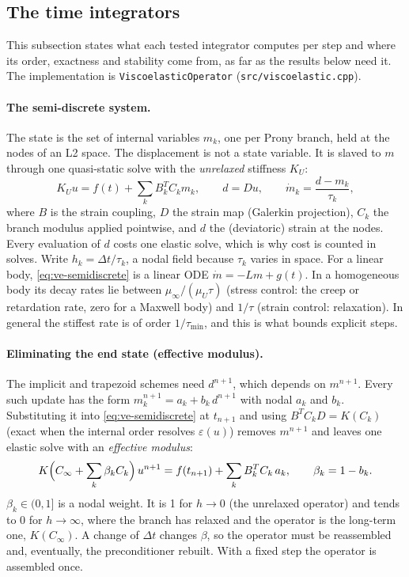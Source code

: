 \documentclass[11pt]{article}
\numberwithin{equation}{section}
\newcommand{\eps}{\varepsilon}
\newcommand{\code}[1]{\texttt{#1}}
\begin{document}
\subsection{The time integrators}
\label{sec:steppers}

This subsection states what each tested integrator computes per step and
where its order, exactness and stability come from, as far as the results
below need it. The implementation is \code{ViscoelasticOperator}
(\code{src/viscoelastic.cpp}).

\paragraph{The semi-discrete system.}
The state is the set of internal variables $m_k$, one per Prony branch,
held at the nodes of an L2 space. The displacement is not a state
variable. It is slaved to $m$ through one quasi-static solve with the
\emph{unrelaxed} stiffness $K_U$:
\begin{equation}
  K_U u = f(t) + \sum_k B_k^{T} C_k m_k,\qquad d = D u,\qquad
  \dot m_k = \frac{d - m_k}{\tau_k},
  \label{eq:ve-semidiscrete}
\end{equation}
where $B$ is the strain coupling, $D$ the strain map (Galerkin projection),
$C_k$ the branch modulus applied pointwise, and $d$ the (deviatoric)
strain at the nodes. Every evaluation of $d$ costs one elastic solve, which
is why cost is counted in solves. Write $h_k=\Delta t/\tau_k$, a nodal field
because $\tau_k$ varies in space. For a linear body,
\eqref{eq:ve-semidiscrete} is a linear ODE $\dot m=-Lm+g(t)$. In a
homogeneous body its decay rates lie between $\mu_\infty/(\mu_U\tau)$
(stress control: the creep or retardation rate, zero for a Maxwell body)
and $1/\tau$ (strain control: relaxation). In general the stiffest rate is
of order $1/\tau_{\min}$, and this is what bounds explicit steps.

\paragraph{Eliminating the end state (effective modulus).}
The implicit and trapezoid schemes need $d^{n+1}$, which depends on
$m^{n+1}$. Every such update has the form
$m_k^{n+1}=a_k + b_k\,d^{n+1}$ with nodal $a_k$ and $b_k$. Substituting it
into \eqref{eq:ve-semidiscrete} at $t_{n+1}$ and using
$B^{T}C_kD=K(C_k)$ (exact when the internal order resolves $\eps(u)$)
removes $m^{n+1}$ and leaves one elastic solve with an \emph{effective
modulus}:
\begin{equation}
  K\Bigl(C_\infty+\sum_k\beta_kC_k\Bigr)\,u^{n+1}
  = f(t_{n+1}) + \sum_k B_k^{T}C_k\,a_k,
  \qquad \beta_k = 1-b_k .
  \label{eq:ve-effective}
\end{equation}
$\beta_k\in(0,1]$ is a nodal weight. It is 1 for $h\to0$ (the unrelaxed
operator) and tends to 0 for $h\to\infty$, where the branch has relaxed
and the operator is the long-term one, $K(C_\infty)$. A change of
$\Delta t$ changes $\beta$, so the operator must be reassembled and,
eventually, the preconditioner rebuilt. With a fixed step the operator is
assembled once.
\end{document}
